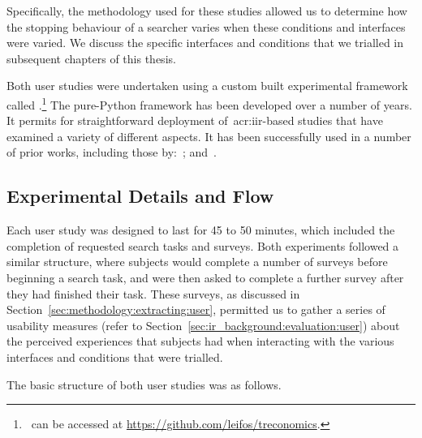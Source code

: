 Specifically, the methodology used for these studies allowed us to determine how the stopping behaviour of a searcher varies when these conditions and interfaces were varied. We discuss the specific interfaces and conditions that we trialled in subsequent chapters of this thesis.

Both user studies were undertaken using a custom built experimental framework called .\footnote{\treconomics~can be accessed at \url{https://github.com/leifos/treconomics}. } The pure-Python framework has been developed over a number of years. It permits for straightforward deployment of~\gls{acr:iir}-based studies that have examined a variety of different aspects. It has been successfully used in a number of prior works, including those by:~\cite{azzopardi2013query_cost, maxwell2014temporal_delays, kelly2015serp_size, edwards2015query_interface}; and~\cite{crescenzi2016time_constraints}.


\subsection{Experimental Details and Flow}\label{sec:methodology:user:flow}
Each user study was designed to last for 45 to 50 minutes, which included the completion of requested search tasks and surveys. Both experiments followed a similar structure, where subjects would complete a number of surveys before beginning a search task, and were then asked to complete a further survey after they had finished their task. These surveys, as discussed in Section~\ref{sec:methodology:extracting:user}, permitted us to gather a series of usability measures (refer to Section~\ref{sec:ir_background:evaluation:user}) about the perceived experiences that subjects had when interacting with the various interfaces and conditions that were trialled.

The basic structure of both user studies was as follows.

